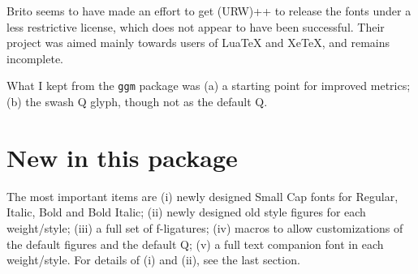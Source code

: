 \documentclass[11pt]{article}
\begin{document}
Brito seems to have made an effort to get (URW)++ to release the fonts under a less restrictive license, which  does not appear to have been successful.
Their project was aimed mainly towards users of LuaTeX and XeTeX, and remains incomplete.

What I kept from the \texttt{ggm} package was (a) a starting point for improved metrics; (b) the swash Q glyph, though not as the default Q. 
\section{New in this package}
The most important items are (i) newly designed Small Cap fonts for Regular, Italic, Bold and Bold Italic; (ii) newly designed old style figures for each weight/style; (iii) a full set of f-ligatures; (iv) macros to allow customizations of the default figures and the default Q; (v) a full text companion font in each weight/style. For details of (i) and (ii), see the last section.
\end{document}
